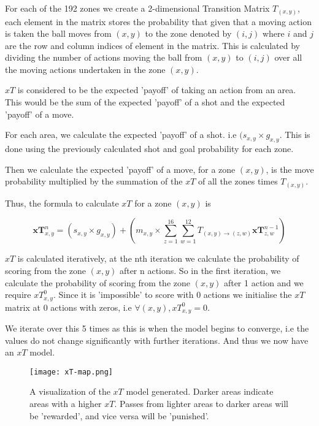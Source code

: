 \documentclass[11pt]{article}
\begin{document}
For each of the 192 zones we create a 2-dimensional Transition Matrix $T_(x,y)$, each element in the matrix stores the probability that given that a moving action is taken the ball moves from $(x, y)$ to the zone denoted by $(i, j)$ where $i$ and $j$ are the row and column indices of element in the matrix. This is calculated by dividing the number of actions moving the ball from $(x, y)$ to $(i, j)$ over all the moving actions undertaken in the zone $(x, y)$.

$xT$ is considered to be the expected 'payoff' of taking an action from an area. This would be the sum of the expected 'payoff' of a shot and the expected 'payoff' of a move.

For each area, we calculate the expected 'payoff' of a shot. i.e $(s_{x, y} \times g_{x, y}$. This is done using the previously calculated shot and goal probability for each zone.

Then we calculate the expected 'payoff' of a move, for a zone $(x, y)$, is the move probability multiplied by the summation of the $xT$ of all the zones times $T_(x,y)$.

Thus, the formula to calculate $xT$ for a zone $(x, y)$ is

\begin{equation}
\mathbf{x T}^n_{x, y}=\left(s_{x, y} \times g_{x, y}\right)+\left(m_{x, y} \times \sum_{z=1}^{16} \sum_{w=1}^{12} T_{(x, y) \rightarrow(z, w)} \mathbf{x T}^{n-1}_{z, w}\right)
\end{equation}

$xT$ is calculated iteratively, at the nth iteration we calculate the probability of scoring from the zone $(x, y)$ after n actions. So in the first iteration, we calculate the probability of scoring from the zone $(x, y)$ after 1 action and we require ${x T}^0_{x, y}$. Since it is 'impossible' to score with 0 actions we initialise the $xT$ matrix at 0 actions with zeros, i.e $\forall (x,y), {x T}^0_{x, y} = 0 $.

We iterate over this 5 times as this is when the model begins to converge, i.e the values do not change significantly with further iterations. And thus we now have an $xT$ model.

\begin{figure}[t!]
    \centering
    \texttt{[image: xT-map.png]}
    \caption{A visualization of the $xT$ model generated. Darker areas indicate areas with a higher $xT$. Passes from lighter areas to darker areas will be 'rewarded', and vice versa will be 'punished'.}
    \label{fig:xT-map}
\end{figure}
\end{document}
